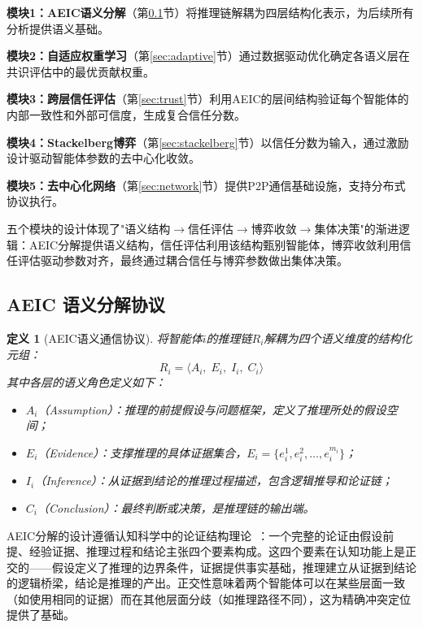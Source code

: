 \documentclass[12pt,a4paper,UTF8,fontset=fandol]{ctexart}
\newtheorem{definition}{定义}[section]
\begin{document}
\textbf{模块1：AEIC语义分解}（第\ref{sec:aeic}节）将推理链解耦为四层结构化表示，为后续所有分析提供语义基础。

\textbf{模块2：自适应权重学习}（第\ref{sec:adaptive}节）通过数据驱动优化确定各语义层在共识评估中的最优贡献权重。

\textbf{模块3：跨层信任评估}（第\ref{sec:trust}节）利用AEIC的层间结构验证每个智能体的内部一致性和外部可信度，生成复合信任分数。

\textbf{模块4：Stackelberg博弈}（第\ref{sec:stackelberg}节）以信任分数为输入，通过激励设计驱动智能体参数的去中心化收敛。

\textbf{模块5：去中心化网络}（第\ref{sec:network}节）提供P2P通信基础设施，支持分布式协议执行。

五个模块的设计体现了"语义结构$\to$信任评估$\to$博弈收敛$\to$集体决策"的渐进逻辑：AEIC分解提供语义结构，信任评估利用该结构甄别智能体，博弈收敛利用信任评估驱动参数对齐，最终通过耦合信任与博弈参数做出集体决策。

\subsection{AEIC 语义分解协议}\label{sec:aeic}

\begin{definition}[AEIC语义通信协议]
将智能体$i$的推理链$R_i$解耦为四个语义维度的结构化元组：
\begin{equation}
R_i = \langle A_i,\; E_i,\; I_i,\; C_i \rangle
\end{equation}
其中各层的语义角色定义如下：
\begin{itemize}[nosep]
    \item $A_i$（Assumption）：推理的前提假设与问题框架，定义了推理所处的假设空间；
    \item $E_i$（Evidence）：支撑推理的具体证据集合，$E_i = \{e_i^1, e_i^2, \ldots, e_i^{m_i}\}$；
    \item $I_i$（Inference）：从证据到结论的推理过程描述，包含逻辑推导和论证链；
    \item $C_i$（Conclusion）：最终判断或决策，是推理链的输出端。
\end{itemize}
\end{definition}

AEIC分解的设计遵循认知科学中的论证结构理论~\cite{fudenberg1991game}：一个完整的论证由假设前提、经验证据、推理过程和结论主张四个要素构成。这四个要素在认知功能上是正交的——假设定义了推理的边界条件，证据提供事实基础，推理建立从证据到结论的逻辑桥梁，结论是推理的产出。正交性意味着两个智能体可以在某些层面一致（如使用相同的证据）而在其他层面分歧（如推理路径不同），这为精确冲突定位提供了基础。
\end{document}
